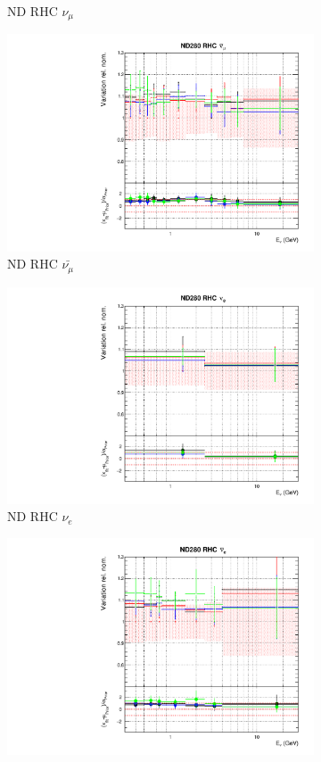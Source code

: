 \begin{figure}[t]
\begin{subfigure}{0.24\textwidth}
  \caption{ND RHC $\nu_{\mu}$}
\end{subfigure}
\begin{subfigure}{0.24\textwidth}
  \centering
  \includegraphics[width=0.95\linewidth]{figs/detcovbinflux_5}
  \caption{ND RHC $\bar{\nu_{\mu}}$}
\end{subfigure}
\begin{subfigure}{0.24\textwidth}
  \centering
  \includegraphics[width=0.95\linewidth]{figs/detcovbinflux_6}
  \caption{ND RHC $\nu_e$}
\end{subfigure}
\vspace{15mm}
\begin{subfigure}{0.24\textwidth}
  \centering
  \includegraphics[width=0.95\linewidth]{figs/detcovbinflux_7}

\end{subfigure}
\end{figure}
